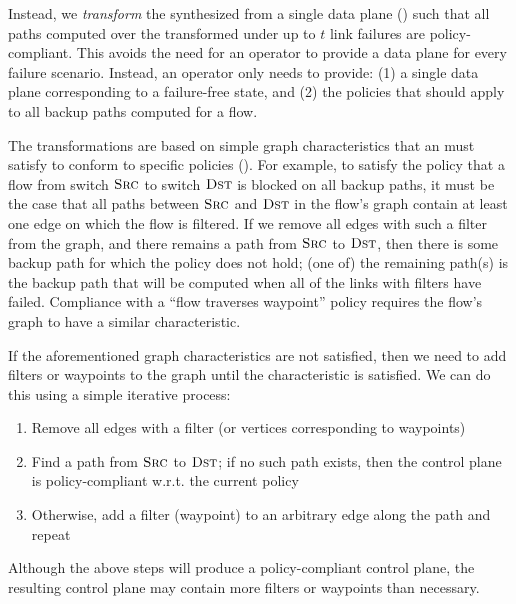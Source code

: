Instead, we 
{\em transform} the \ARC synthesized from a single data plane
() such that all paths computed over the transformed \ARC under
up to $t$ link failures are policy-compliant. This avoids the need for an
operator to provide a data plane for every failure scenario. Instead, an
operator only needs to provide: (1) a single data plane corresponding to a
failure-free state, and (2) the policies that should apply to all backup paths
computed for a flow. 



The transformations are based on simple graph characteristics that an \ARC
must satisfy to conform to specific policies
().  
For example, to satisfy the policy that a flow from switch $\textsc{Src}$ to
switch $\textsc{Dst}$ is blocked on all backup paths, it must be the case that
all paths between $\textsc{Src}$ and $\textsc{Dst}$ in the flow's graph  contain at least one edge on which the flow is
filtered. If we remove all edges with such a filter from the graph, and there
remains a path from $\textsc{Src}$ to $\textsc{Dst}$, then there is some backup
path for which the policy does not hold; (one of) the remaining path(s) is the
backup path that will be computed when all of the links with filters have
failed. Compliance with a ``flow traverses waypoint'' policy requires the
flow's graph to have a similar characteristic.

If the aforementioned graph characteristics are not satisfied, then we need to
add filters or waypoints to the graph until the characteristic is satisfied.
We can do this using a simple iterative process: 
\begin{enumerate}
\item Remove all edges with a filter (or vertices corresponding to waypoints) 
\item Find a path from $\textsc{Src}$ to $\textsc{Dst}$; if no such path exists,
    then the control plane is policy-compliant w.r.t. the current policy
\item Otherwise, add a filter (waypoint) to an arbitrary edge along the path
    and repeat
\end{enumerate}

Although the above steps will produce a policy-compliant control plane, the
resulting control plane may contain more filters or waypoints than necessary.


